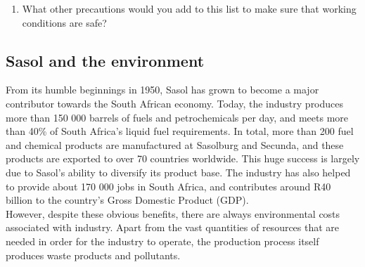 {\begin{enumerate}
\begin{itemize}
\item{employing experienced Safety, Health and Environment personnel}
\item{regular training to identify hazards}
\item{equipment maintenance and routine checks}
\end{itemize}

\item{What other precautions would you add to this list to make sure that working conditions are safe?}

\end{enumerate}

}

\subsection{Sasol and the environment}

From its humble beginnings in 1950, Sasol has grown to become a major contributor towards the South African economy. Today, the industry produces more than 150 000 barrels of fuels and petrochemicals per day, and meets more than 40\% of South Africa's liquid fuel requirements. In total, more than 200 fuel and chemical products are manufactured at Sasolburg and Secunda, and these products are exported to over 70 countries worldwide. This huge success is largely due to Sasol's ability to diversify its product base. The industry has also helped to provide about 170 000 jobs in South Africa, and contributes around R40 billion to the country's Gross Domestic Product (GDP).\\

However, despite these obvious benefits, there are always environmental costs associated with industry. Apart from the vast quantities of resources that are needed in order for the industry to operate, the production process itself produces waste products and pollutants.

